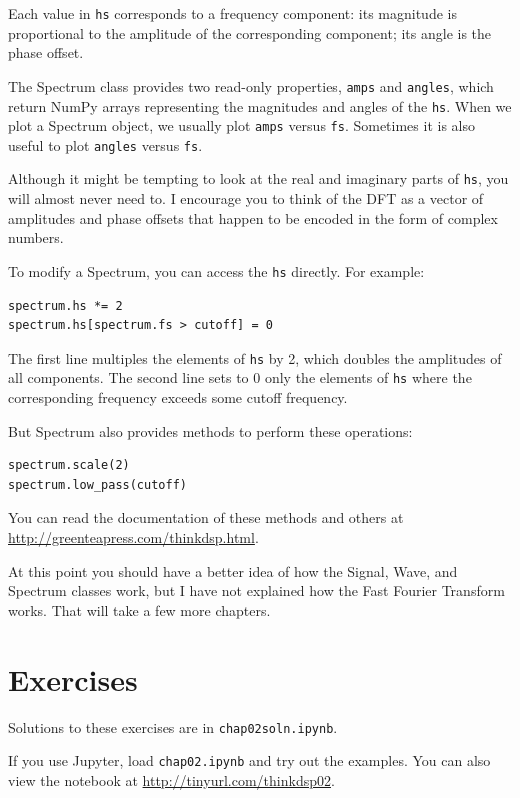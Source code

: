 \documentclass[12pt]{book}
\begin{document}
Each value in {\tt hs} corresponds to a frequency component: its
magnitude is proportional to the amplitude of the corresponding
component; its angle is the phase offset.

The Spectrum class provides two read-only properties, {\tt amps}
and {\tt angles}, which return NumPy arrays representing the
magnitudes and angles of the {\tt hs}.  When we plot a Spectrum
object, we usually plot {\tt amps} versus {\tt fs}.  Sometimes
it is also useful to plot {\tt angles} versus {\tt fs}.

Although it might be tempting to look at the real and imaginary
parts of {\tt hs}, you will almost never need to.  I encourage
you to think of the DFT as a vector of amplitudes and phase offsets
that happen to be encoded in the form of complex numbers.

To modify a Spectrum, you can access the {\tt hs} directly.
For example:

\begin{verbatim}
spectrum.hs *= 2
spectrum.hs[spectrum.fs > cutoff] = 0
\end{verbatim}

The first line multiples the elements of {\tt hs} by 2, which
doubles the amplitudes of all components.  The second line
sets to 0 only the elements of {\tt hs} where the corresponding
frequency exceeds some cutoff frequency.

But Spectrum also provides methods to perform these operations:

\begin{verbatim}
spectrum.scale(2)
spectrum.low_pass(cutoff)
\end{verbatim}

You can read the documentation of these methods and others at
\url{http://greenteapress.com/thinkdsp.html}.

At this point you should have a better idea of how the Signal, Wave,
and Spectrum classes work, but I have not explained how the Fast
Fourier Transform works.  That will take a few more chapters.


\section{Exercises}

Solutions to these exercises are in {\tt chap02soln.ipynb}.

\begin{exercise}
If you use Jupyter, load {\tt chap02.ipynb} and try out the examples.
You can also view the notebook at \url{http://tinyurl.com/thinkdsp02}.
\end{exercise}
\end{document}
